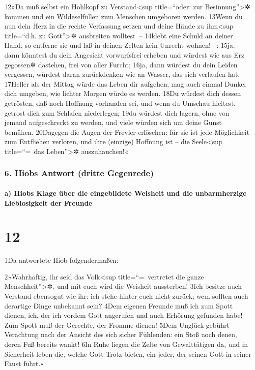 12»Da muß selbst ein Hohlkopf zu Verstand\textless sup title=``oder: zur
Besinnung''\textgreater✲ kommen und ein Wildeselfüllen zum Menschen
umgeboren werden. 13Wenn du nun dein Herz in die rechte Verfassung
setzen und deine Hände zu ihm\textless sup title=``d.h. zu
Gott''\textgreater✲ ausbreiten wolltest~-- 14klebt eine Schuld an deiner
Hand, so entferne sie und laß in deinen Zelten kein Unrecht wohnen! --:
15ja, dann könntest du dein Angesicht vorwurfsfrei erheben und würdest
wie aus Erz gegossen✲ dastehen, frei von aller Furcht; 16ja, dann
würdest du dein Leiden vergessen, würdest daran zurückdenken wie an
Wasser, das sich verlaufen hat. 17Heller als der Mittag würde das Leben
dir aufgehen; mag auch einmal Dunkel dich umgeben, wie lichter Morgen
würde es werden. 18Du würdest dich dessen getrösten, daß noch Hoffnung
vorhanden sei, und wenn du Umschau hieltest, getrost dich zum Schlafen
niederlegen; 19du würdest dich lagern, ohne von jemand aufgeschreckt zu
werden, und viele würden sich um deine Gunst bemühen. 20Dagegen die
Augen der Frevler erlöschen: für sie ist jede Möglichkeit zum Entfliehen
verloren, und ihre (einzige) Hoffnung ist -- die Seele\textless sup
title=``=~das Leben''\textgreater✲ auszuhauchen!«

\hypertarget{hiobs-antwort-dritte-gegenrede}{%
\subsubsection{6. Hiobs Antwort (dritte
Gegenrede)}\label{hiobs-antwort-dritte-gegenrede}}

\hypertarget{a-hiobs-klage-uxfcber-die-eingebildete-weisheit-und-die-unbarmherzige-lieblosigkeit-der-freunde}{%
\paragraph{a) Hiobs Klage über die eingebildete Weisheit und die
unbarmherzige Lieblosigkeit der
Freunde}\label{a-hiobs-klage-uxfcber-die-eingebildete-weisheit-und-die-unbarmherzige-lieblosigkeit-der-freunde}}

\hypertarget{section-11}{%
\section{12}\label{section-11}}

1Da antwortete Hiob folgendermaßen:

2»Wahrhaftig, ihr seid das Volk\textless sup title=``=~vertretet die
ganze Menschheit''\textgreater✲, und mit euch wird die Weisheit
aussterben! 3Ich besitze auch Verstand ebensogut wie ihr: ich stehe
hinter euch nicht zurück; wem sollten auch derartige Dinge unbekannt
sein? 4Dem eigenen Freunde muß ich zum Spott dienen, ich, der ich vordem
Gott angerufen und auch Erhörung gefunden habe! Zum Spott muß der
Gerechte, der Fromme dienen! 5Dem Unglück gebührt Verachtung nach der
Ansicht des sich sicher Fühlenden: ein Stoß noch denen, deren Fuß
bereits wankt! 6In Ruhe liegen die Zelte von Gewalttätigen da, und in
Sicherheit leben die, welche Gott Trotz bieten, ein jeder, der seinen
Gott in seiner Faust führt.«

